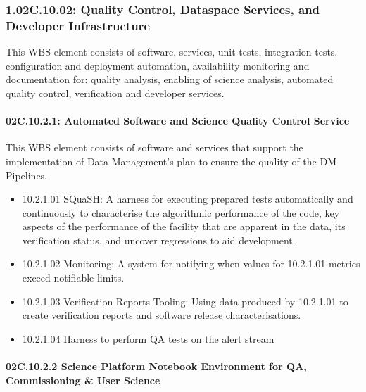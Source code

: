 \subsubsection{1.02C.10.02: Quality Control, Dataspace Services, and Developer Infrastructure}

This WBS element consists of software, services, unit tests, integration tests, configuration and deployment automation, availability monitoring and documentation for: quality analysis, enabling of science analysis, automated quality control, verification and developer services.

\paragraph{02C.10.2.1: Automated Software and Science Quality Control Service}

This WBS element consists of software and services that support the
implementation of Data Management's plan to ensure the quality of the DM
Pipelines.

\begin{itemize}

\item
  10.2.1.01 SQuaSH: A harness for executing prepared tests automatically
  and continuously to characterise the algorithmic performance of the
  code, key aspects of the performance of the facility that are apparent
  in the data, its verification status, and uncover regressions to aid
  development.
\item
  10.2.1.02 Monitoring: A system for notifying when values for 10.2.1.01
  metrics exceed notifiable limits.
\item
  10.2.1.03 Verification Reports Tooling: Using data produced by
  10.2.1.01 to create verification reports and software release
  characterisations.
\item
  10.2.1.04 Harness to perform QA tests on the alert stream

\end{itemize}

\paragraph{02C.10.2.2 Science Platform Notebook Environment for QA,  Commissioning \& User Science}


